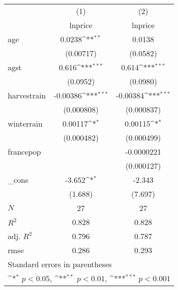{
\def\sym#1{\ifmmode^{#1}\else\(^{#1}\)\fi}
\begin{tabular}{l*{2}{c}}
\hline\hline
            &\multicolumn{1}{c}{(1)}&\multicolumn{1}{c}{(2)}\\
            &\multicolumn{1}{c}{lnprice}&\multicolumn{1}{c}{lnprice}\\
\hline
age         &      0.0238\sym{**} &      0.0138         \\
            &   (0.00717)         &    (0.0582)         \\
[1em]
agst        &       0.616\sym{***}&       0.614\sym{***}\\
            &    (0.0952)         &    (0.0980)         \\
[1em]
harvestrain &    -0.00386\sym{***}&    -0.00384\sym{***}\\
            &  (0.000808)         &  (0.000837)         \\
[1em]
winterrain  &     0.00117\sym{*}  &     0.00115\sym{*}  \\
            &  (0.000482)         &  (0.000499)         \\
[1em]
francepop   &                     &  -0.0000221         \\
            &                     &  (0.000127)         \\
[1em]
\_cons      &      -3.652\sym{*}  &      -2.343         \\
            &     (1.688)         &     (7.697)         \\
\hline
\(N\)       &          27         &          27         \\
\(R^{2}\)   &       0.828         &       0.828         \\
adj. \(R^{2}\)&       0.796         &       0.787         \\
rmse        &       0.286         &       0.293         \\
\hline\hline
\multicolumn{3}{l}{\footnotesize Standard errors in parentheses}\\
\multicolumn{3}{l}{\footnotesize \sym{*} \(p<0.05\), \sym{**} \(p<0.01\), \sym{***} \(p<0.001\)}\\
\end{tabular}
}
